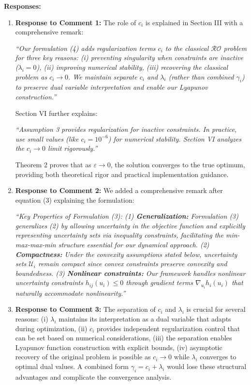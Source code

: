 \documentclass[journal,twoside,web]{ieeecolor}
\begin{document}
\noindent\textbf{Responses:}

\begin{enumerate}
\item \textbf{Response to Comment 1:} The role of $c_i$ is explained in Section III with a comprehensive remark:

{\color{revisionblue}\textit{``Our formulation (4) adds regularization terms $c_i$ to the classical $\mathcal{RO}$ problem for three key reasons: (i) preventing singularity when constraints are inactive ($\lambda_i = 0$), (ii) improving numerical stability, (iii) recovering the classical problem as $c_i \to 0$. We maintain separate $c_i$ and $\lambda_i$ (rather than combined $\gamma_i$) to preserve dual variable interpretation and enable our Lyapunov construction.''}}

Section VI further explains:

{\color{revisionblue}\textit{``Assumption 3 provides regularization for inactive constraints. In practice, use small values (like $c_i = 10^{-6}$) for numerical stability. Section VI analyzes the $c_i \to 0$ limit rigorously.''}}

Theorem 2 proves that as $\varepsilon \to 0$, the solution converges to the true optimum, providing both theoretical rigor and practical implementation guidance.

\item \textbf{Response to Comment 2:} We added a comprehensive remark after equation (3) explaining the formulation:

{\color{revisionblue}\textit{``Key Properties of Formulation (3): (1) \textbf{Generalization:} Formulation (3) generalizes (2) by allowing uncertainty in the objective function and explicitly representing uncertainty sets via inequality constraints, facilitating the min-max-max-min structure essential for our dynamical approach. (2) \textbf{Compactness:} Under the convexity assumptions stated below, uncertainty sets $\mathcal{U}_i$ remain compact since convex constraints preserve convexity and boundedness. (3) \textbf{Nonlinear constraints:} Our framework handles nonlinear uncertainty constraints $h_{ij}(u_i) \leq 0$ through gradient terms $\nabla_{u_i} h_i(u_i)$ that naturally accommodate nonlinearity.''}}

\item \textbf{Response to Comment 3:} The separation of $c_i$ and $\lambda_i$ is crucial for several reasons: (i) $\lambda_i$ maintains its interpretation as a dual variable that adapts during optimization, (ii) $c_i$ provides independent regularization control that can be set based on numerical considerations, (iii) the separation enables Lyapunov function construction with explicit bounds, (iv) asymptotic recovery of the original problem is possible as $c_i \to 0$ while $\lambda_i$ converges to optimal dual values. A combined form $\gamma_i = c_i + \lambda_i$ would lose these structural advantages and complicate the convergence analysis.


\end{enumerate}
\end{document}
